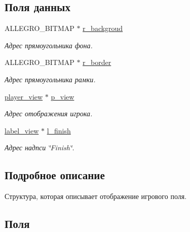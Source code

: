 \subsection*{Поля данных}
\begin{DoxyCompactItemize}
\item 
A\+L\+L\+E\+G\+R\+O\+\_\+\+B\+I\+T\+M\+AP $\ast$ \hyperlink{structfield__view_ab53c9a1f28f08baf51ad715a0959d7bd}{r\+\_\+backgroud}
\begin{DoxyCompactList}\small\item\em Адрес прямоугольника фона. \end{DoxyCompactList}\item 
A\+L\+L\+E\+G\+R\+O\+\_\+\+B\+I\+T\+M\+AP $\ast$ \hyperlink{structfield__view_a55858cc4e1caeeea539ff16ddd1baa79}{r\+\_\+border}
\begin{DoxyCompactList}\small\item\em Адрес прямоугольника рамки. \end{DoxyCompactList}\item 
\hyperlink{structplayer__view}{player\+\_\+view} $\ast$ \hyperlink{structfield__view_ab3016ab1d95a4391f499cb754981d783}{p\+\_\+view}
\begin{DoxyCompactList}\small\item\em Адрес отображения игрока. \end{DoxyCompactList}\item 
\hyperlink{structlabel__view}{label\+\_\+view} $\ast$ \hyperlink{structfield__view_ab27a2b7d362ab502ba9430d59236f5ef}{l\+\_\+finish}
\begin{DoxyCompactList}\small\item\em Адрес надпси \char`\"{}\+Finish\char`\"{}. \end{DoxyCompactList}\end{DoxyCompactItemize}


\subsection{Подробное описание}
Структура, которая описывает отображение игрового поля. 

\subsection{Поля}
\mbox{\label{structfield__view_ab27a2b7d362ab502ba9430d59236f5ef}} 
